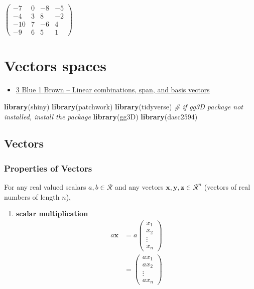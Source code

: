 \documentclass[
]{book}
\newenvironment{Shaded}{\begin{snugshade}}{\end{snugshade}}
\newcommand{\CommentTok}[1]{\textcolor[rgb]{0.56,0.35,0.01}{\textit{#1}}}
\newcommand{\KeywordTok}[1]{\textcolor[rgb]{0.13,0.29,0.53}{\textbf{#1}}}
\newcommand{\NormalTok}[1]{#1}
\providecommand{\tightlist}{%
  \setlength{\itemsep}{0pt}\setlength{\parskip}{0pt}}
\theoremstyle{definition}
\theoremstyle{definition}
\theoremstyle{definition}
\theoremstyle{definition}
\theoremstyle{remark}
\begin{document}
\(\begin{pmatrix} -7 & 0 & -8 & -5 \\ -4 & 3 & 8 & -2 \\ -10 & 7 & -6 & 4 \\ -9 & 6 & 5 & 1 \end{pmatrix}\)

\hypertarget{vector-spaces}{%
\chapter{Vectors spaces}\label{vector-spaces}}

\begin{itemize}
\tightlist
\item
  \href{https://www.3blue1brown.com/lessons/span}{3 Blue 1 Brown -- Linear combinations, span, and basis vectors}
\end{itemize}

\begin{Shaded}
\begin{Highlighting}[]
\KeywordTok{library}\NormalTok{(shiny)}
\KeywordTok{library}\NormalTok{(patchwork)}
\KeywordTok{library}\NormalTok{(tidyverse)}
\CommentTok{# if gg3D package not installed, install the package}
\KeywordTok{library}\NormalTok{(gg3D)}
\KeywordTok{library}\NormalTok{(dasc2594)}
\end{Highlighting}
\end{Shaded}

\hypertarget{vectors}{%
\section{Vectors}\label{vectors}}

\hypertarget{properties-of-vectors}{%
\subsection{Properties of Vectors}\label{properties-of-vectors}}

For any real valued scalars \(a, b \in \mathcal{R}\) and any vectors \(\mathbf{x}, \mathbf{y}, \mathbf{z} \in \mathcal{R}^n\) (vectors of real numbers of length \(n\)),

\begin{enumerate}
\def\labelenumi{\arabic{enumi})}
\tightlist
\item
  \textbf{scalar multiplication}
  \[
  \begin{aligned}
  a \mathbf{x} & = a \begin{pmatrix} x_1 \\ x_2 \\ \vdots \\ x_n \end{pmatrix} \\
  & = \begin{pmatrix} a x_1 \\ a x_2 \\ \vdots \\ a x_n \end{pmatrix} 
  \end{aligned}
  \]
\end{enumerate}
\end{document}
